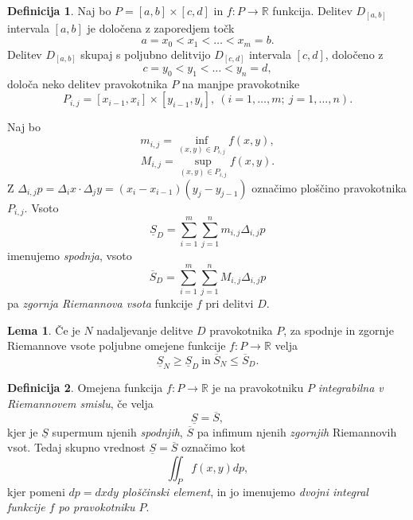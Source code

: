 \documentclass[11pt]{article}
\theoremstyle{definition}
\newtheorem{definicija}{Definicija}[section]
\theoremstyle{definition}
\theoremstyle{definition}
\newtheorem{lema}{Lema}
\begin{document}
\begin{definicija}

Naj bo $P = [a, b] \times [c, d]$ in $f: P \rightarrow \mathbb{R}$ funkcija. Delitev $D_{[a, b]}$ intervala $[a, b]$ je določena z zaporedjem točk
$$a = x_0 < x_1 < \ldots < x_m = b.$$
Delitev $D_{[a, b]}$ skupaj s poljubno delitvijo $D_{[c, d]}$ intervala $[c, d]$, določeno z 
$$c = y_0 < y_1 < \ldots < y_n = d,$$
določa neko delitev pravokotnika $P$ na manjpe pravokotnike
$$P_{i,j} = [x_{i-1}, x_i] \times [y_{i-1}, y_i], ~(i = 1, \ldots, m; ~j = 1, \ldots, n).$$

Naj bo 
$$m_{i,j} = \inf_{(x,y) \in P_{i,j}} f(x, y),$$
$$M_{i,j} = \sup_{(x,y) \in P_{i,j}} f(x, y).$$
Z $\Delta_{i,j} p = \Delta_i x \cdot \Delta_j y = (x_i - x_{i-1})(y_j - y_{j-1})$ označimo ploščino pravokotnika $P_{i,j}$. 
Vsoto
$$\underline{S}_D = \sum_{i=1}^{m} \sum_{j=1}^{n} m_{i,j} \Delta_{i,j} p$$
imenujemo \textit{spodnja}, vsoto
$$\overline{S}_D = \sum_{i=1}^{m} \sum_{j=1}^{n} M_{i,j} \Delta_{i,j} p$$
pa \textit{zgornja Riemannova vsota} funkcije $f$ pri delitvi $D$.

\end{definicija}
\vspace{0.5cm}

\begin{lema}

Če je $N$ nadaljevanje delitve $D$ pravokotnika $P$, za spodnje in zgornje Riemannove vsote poljubne omejene funkcije $f: P \rightarrow \mathbb{R}$ velja
$$\underline{S}_N \geq \underline{S}_D ~\text{in}~ \overline{S}_N \leq \overline{S}_D.$$

\end{lema}
\vspace{0.5cm}

\begin{definicija}

Omejena funkcija $f: P \rightarrow \mathbb{R}$ je na pravokotniku $P$ \textit{integrabilna v Riemannovem smislu}, če velja
$$\underline{S} = \overline{S},$$
kjer je $\underline{S}$ supermum njenih \textit{spodnjih}, $\overline{S}$ pa infimum njenih \textit{zgornjih} Riemannovih vsot. Tedaj skupno vrednost $\underline{S} = \overline{S}$ označimo kot 
$$\iint_P f(x, y) dp,$$
kjer pomeni $dp = dxdy$ \textit{ploščinski element}, in jo imenujemo \textit{dvojni integral funkcije $f$ po pravokotniku $P$}.

\end{definicija}
\vspace{0.5cm}
\end{document}
